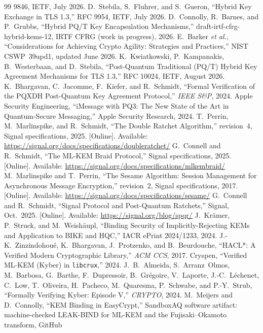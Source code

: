 \documentclass[journal]{IEEEtran}
\newcommand{\code}[1]{\texttt{\small #1}}
\begin{document}
\begin{thebibliography}{99}
9846, IETF, July 2026.
 D.~Stebila, S.~Fluhrer, and S.~Gueron, ``Hybrid Key Exchange in TLS 1.3,'' RFC
9954, IETF, July 2026.
 D.~Connolly, R.~Barnes, and P.~Grubbs, ``Hybrid PQ/T Key Encapsulation
Mechanisms,'' draft-irtf-cfrg-hybrid-kems-12, IRTF CFRG (work in progress), 2026.
 E.~Barker \emph{et al.}, ``Considerations for Achieving Crypto Agility:
Strategies and Practices,'' NIST CSWP~39upd1, updated June 2026.
 K.~Kwiatkowski, P.~Kampanakis, B.~Westerbaan, and D.~Stebila,
``Post-Quantum Traditional (PQ/T) Hybrid Key Agreement Mechanisms for TLS 1.3,'' RFC 10024,
IETF, August 2026.
 K.~Bhargavan, C.~Jacomme, F.~Kiefer, and R.~Schmidt, ``Formal Verification of the
PQXDH Post-Quantum Key Agreement Protocol,'' \emph{IEEE S\&P}, 2024.
 Apple Security Engineering, ``iMessage with PQ3: The New State of the Art in
Quantum-Secure Messaging,'' Apple Security Research, 2024.
 T.~Perrin, M.~Marlinspike, and R.~Schmidt, ``The Double Ratchet
Algorithm,'' revision~4, Signal specifications, 2025. [Online]. Available:
\url{https://signal.org/docs/specifications/doubleratchet/}
 G.~Connell and R.~Schmidt, ``The ML-KEM Braid Protocol,'' Signal
specifications, 2025. [Online]. Available:
\url{https://signal.org/docs/specifications/mlkembraid/}
 M.~Marlinspike and T.~Perrin, ``The Sesame Algorithm: Session Management
for Asynchronous Message Encryption,'' revision~2, Signal specifications, 2017. [Online].
Available: \url{https://signal.org/docs/specifications/sesame/}
 G.~Connell and R.~Schmidt, ``Signal Protocol and Post-Quantum
Ratchets,'' Signal, Oct.~2025. [Online]. Available:
\url{https://signal.org/blog/spqr/}
 J.~Kr\"amer, P.~Struck, and M.~Weish\"aupl, ``Binding Security of
Implicitly-Rejecting KEMs and Application to BIKE and HQC,'' IACR ePrint 2024/1233, 2024.
 J.-K.~Zinzindohou\'e, K.~Bhargavan, J.~Protzenko, and B.~Beurdouche, ``HACL*: A
Verified Modern Cryptographic Library,'' \emph{ACM CCS}, 2017.
 Cryspen, ``Verified ML-KEM (Kyber) in \code{libcrux},'' 2024.
 J.~B.~Almeida, S.~Arranz~Olmos, M.~Barbosa, G.~Barthe, F.~Dupressoir,
B.~Gr\'egoire, V.~Laporte, J.-C.~L\'echenet, C.~Low, T.~Oliveira, H.~Pacheco, M.~Quaresma,
P.~Schwabe, and P.-Y.~Strub, ``Formally Verifying Kyber: Episode V,'' \emph{CRYPTO}, 2024.
 M.~Meijers and D.~Connolly, ``KEM Binding in EasyCrypt,'' SandboxAQ software
artifact: machine-checked \mbox{LEAK-BIND} for ML-KEM and the Fujisaki--Okamoto transform, GitHub

\end{thebibliography}
\end{document}
